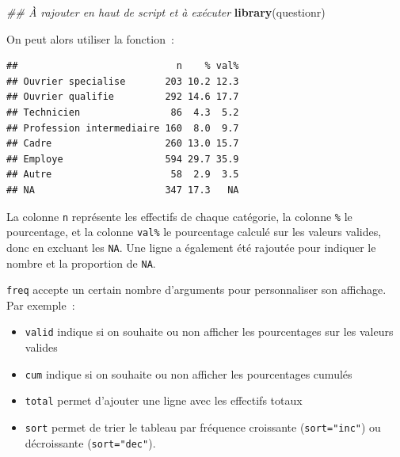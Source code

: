 \documentclass[12pt,]{book}
\newenvironment{Shaded}{\begin{snugshade}}{\end{snugshade}}
\newcommand{\CommentTok}[1]{\textcolor[rgb]{0.56,0.35,0.01}{\textit{#1}}}
\newcommand{\DataTypeTok}[1]{\textcolor[rgb]{0.13,0.29,0.53}{#1}}
\newcommand{\KeywordTok}[1]{\textcolor[rgb]{0.13,0.29,0.53}{\textbf{#1}}}
\newcommand{\NormalTok}[1]{#1}
\newcommand{\OperatorTok}[1]{\textcolor[rgb]{0.81,0.36,0.00}{\textbf{#1}}}
\newcommand{\OtherTok}[1]{\textcolor[rgb]{0.56,0.35,0.01}{#1}}
\newcommand{\StringTok}[1]{\textcolor[rgb]{0.31,0.60,0.02}{#1}}
\providecommand{\tightlist}{%
  \setlength{\itemsep}{0pt}\setlength{\parskip}{0pt}}
\begin{document}
\begin{Shaded}
\begin{Highlighting}[]
\CommentTok{## À rajouter en haut de script et à exécuter}
\KeywordTok{library}\NormalTok{(questionr)}
\end{Highlighting}
\end{Shaded}

On peut alors utiliser la fonction~:

\begin{Shaded}
\end{Shaded}

\begin{verbatim}
##                            n    % val%
## Ouvrier specialise       203 10.2 12.3
## Ouvrier qualifie         292 14.6 17.7
## Technicien                86  4.3  5.2
## Profession intermediaire 160  8.0  9.7
## Cadre                    260 13.0 15.7
## Employe                  594 29.7 35.9
## Autre                     58  2.9  3.5
## NA                       347 17.3   NA
\end{verbatim}

La colonne \texttt{n} représente les effectifs de chaque catégorie, la colonne \texttt{\%} le pourcentage, et la colonne \texttt{val\%} le pourcentage calculé sur les valeurs valides, donc en excluant les \texttt{NA}. Une ligne a également été rajoutée pour indiquer le nombre et la proportion de \texttt{NA}.

\texttt{freq} accepte un certain nombre d'arguments pour personnaliser son affichage. Par exemple~:

\begin{itemize}
\tightlist
\item
  \texttt{valid} indique si on souhaite ou non afficher les pourcentages sur les valeurs valides
\item
  \texttt{cum} indique si on souhaite ou non afficher les pourcentages cumulés
\item
  \texttt{total} permet d'ajouter une ligne avec les effectifs totaux
\item
  \texttt{sort} permet de trier le tableau par fréquence croissante (\texttt{sort="inc"}) ou décroissante (\texttt{sort="dec"}).
\end{itemize}

\begin{Shaded}
\end{Shaded}
\end{document}

